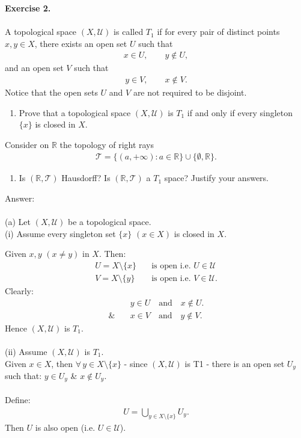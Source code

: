 \documentclass[12pt]{article}
\begin{document}
\newpage
\noindent\textbf{Exercise 2.}\\
\\
A topological space $(X,\mathcal{U})$ is called $T_1$ if for every pair of distinct points $x,y\in X$, there exists an open set $U$ such that
\begin{align*}
x\in U,\qquad y\notin U,
\end{align*}
and an open set $V$ such that
\begin{align*}
y\in V,\qquad x\notin V.
\end{align*}
Notice that the open sets $U$ and $V$ are not required to be disjoint.
\begin{enumerate}
\item[(a)] Prove that a topological space $(X,\mathcal{U})$ is $T_1$ if and only if every singleton $\{x\}$ is closed in $X$.
\end{enumerate}
Consider on $\mathbb{R}$ the topology of right rays
\begin{align*}
\mathcal{T}=\{(a,+\infty):a\in\mathbb{R}\}\cup\{\emptyset,\mathbb{R}\}.
\end{align*}
\begin{enumerate}
\item[(b)] Is $(\mathbb{R},\mathcal{T})$ Hausdorff? Is $(\mathbb{R},\mathcal{T})$ a $T_1$ space? Justify your answers.
\end{enumerate}


\vspace{1cm}
\noindent
Answer:\\
\\
(a) Let $(X,\mathcal{U})$ be a topological space.\\
(i) Assume every singleton set $\{x\}$ $(x\in X)$ is closed in $X$.

\noindent Given $x,y$ $(x\neq y)$ in $X$. Then:
\begin{align*}
U=X\setminus\{x\} &\quad\text{is open i.e. } U\in\mathcal{U}\\
V=X\setminus\{y\} &\quad\text{is open i.e. } V\in\mathcal{U}.
\end{align*}
Clearly:
\begin{align*}
&y\in U \quad\text{and}\quad x\notin U.\\
\text{\&}\quad &x\in V \quad\text{and}\quad y\notin V.
\end{align*}
Hence $(X,\mathcal{U})$ is $T_1$.\\
\\
(ii) Assume $(X,\mathcal{U})$ is $T_1$.\\
Given $x\in X$, then $\forall\,y\in X\setminus\{x\}$ - since $(X,\mathcal{U})$ is T1 - there is an open set $U_y$\\
such that: $y\in U_y$ \& $x\notin U_y$.\\
\\
Define:
\begin{align*}
U=\bigcup_{y\in X\setminus\{x\}}U_y.
\end{align*}
Then $U$ is also open (i.e. $U\in\mathcal{U}$).
\end{document}
